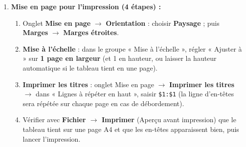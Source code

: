 \documentclass[11pt]{article}
\begin{document}
\begin{corrige}
\begin{enumerate}
    \item \textbf{Mise en page pour l'impression (4 étapes) :}
    \begin{enumerate}
        \item Onglet \textbf{Mise en page} $\rightarrow$ \textbf{Orientation} : choisir \textbf{Paysage} ; puis \textbf{Marges} $\rightarrow$ \textbf{Marges étroites}.
        \item \textbf{Mise à l'échelle} : dans le groupe « Mise à l'échelle », régler « Ajuster à » sur \textbf{1 page en largeur} (et 1 en hauteur, ou laisser la hauteur automatique si le tableau tient en une page).
        \item \textbf{Imprimer les titres} : onglet Mise en page $\rightarrow$ \textbf{Imprimer les titres} $\rightarrow$ dans « Lignes à répéter en haut », saisir \texttt{\$1:\$1} (la ligne d'en-têtes sera répétée sur chaque page en cas de débordement).
        \item Vérifier avec \textbf{Fichier $\rightarrow$ Imprimer} (Aperçu avant impression) que le tableau tient sur une page A4 et que les en-têtes apparaissent bien, puis lancer l'impression.
    \end{enumerate}
\end{enumerate}
\end{corrige}
\end{document}
